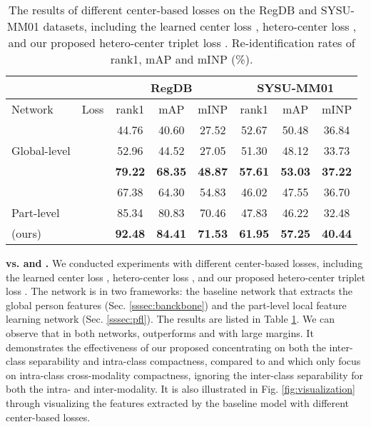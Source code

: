 \documentclass[journal]{IEEEtran}
\begin{document}
\begin{table}
\scriptsize
\caption{The results of different center-based losses on the RegDB and SYSU-MM01 datasets, including the learned center loss , hetero-center loss , and our proposed hetero-center triplet loss . Re-identification rates of rank1, mAP and mINP (\%).}
\label{tab:centerloss}
  \centering
\begin{tabular}{l|c|c|c|c|c|c|c}
   \toprule[2pt]
    \multicolumn{2}{c|}{} & \multicolumn{3}{c|}{RegDB} & \multicolumn{3}{c}{SYSU-MM01}\\ \hline
    Network & Loss & rank1 & mAP & mINP & rank1 & mAP & mINP \\ \toprule[1pt]
    \multirow{3}{*}{Global-level}&  &  44.76 & 40.60 & 27.52 & 52.67 & 50.48 & 36.84\\
    &  & 52.96 & 44.52 & 27.05 & 51.30 & 48.12 & 33.73 \\
    &  & \textbf{79.22} & \textbf{68.35} & \textbf{48.87} &  \textbf{57.61} & \textbf{53.03} & \textbf{37.22}  \\ \hline \hline
    &  &  67.38 & 64.30 & 54.83 &  46.02 & 47.55 & 36.70  \\
    Part-level &  & 85.34 & 80.83 & 70.46 &  47.83 & 46.22 & 32.48 \\
    (ours)& & \textbf{92.48} & \textbf{84.41} & \textbf{71.53} & \textbf{61.95} & \textbf{57.25} & \textbf{40.44} \\ \toprule[2pt]
  \end{tabular}
\end{table}

\textbf{ vs.  and .} We conducted experiments with different center-based losses, including the learned center loss , hetero-center loss , and our proposed hetero-center triplet loss . The network is in two frameworks: the baseline network that extracts the global person features (Sec. \ref{sssec:banckbone}) and the part-level local feature learning network (Sec. \ref{sssec:pfl}). The results are listed in Table \ref{tab:centerloss}. We can observe that in both networks,  outperforms  and  with large margins. It demonstrates the effectiveness of our proposed  concentrating on both the inter-class separability and intra-class compactness, compared to  and  which only focus on intra-class cross-modality compactness, ignoring the inter-class separability for both the intra- and inter-modality. It is also illustrated in Fig. \ref{fig:visualization} through visualizing the features extracted by the baseline model with different center-based losses.
\end{document}
